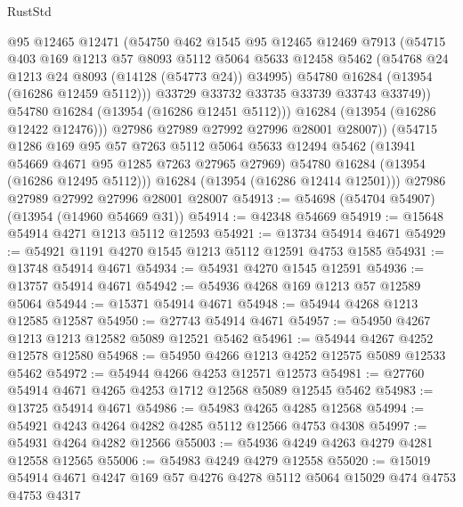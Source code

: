 \begin{lexlean}{RustStd}
\begin{coremodule}
                @95
                @12465
                @12471
                (@54750
                  @462
                  @1545
                  @95
                  @12465
                  @12469
                  @7913
                  (@54715
                    @403
                    @169
                    @1213
                    @57
                    @8093
                    @5112
                    @5064
                    @5633
                    @12458
                    @5462
                    (@54768 @24 @1213 @24 @8093 (@14128 (@54773 @24)) @34995)
                    @54780
                    @16284
                    (@13954 (@16286 @12459 @5112)))
                  @33729
                  @33732
                  @33735
                  @33739
                  @33743
                  @33749))
              @54780
              @16284
              (@13954 (@16286 @12451 @5112)))
            @16284
            (@13954 (@16286 @12422 @12476)))
          @27986
          @27989
          @27992
          @27996
          @28001
          @28007))
      (@54715
        @1286
        @169
        @95
        @57
        @7263
        @5112
        @5064
        @5633
        @12494
        @5462
        (@13941 @54669 @4671 @95 @1285 @7263 @27965 @27969)
        @54780
        @16284
        (@13954 (@16286 @12495 @5112)))
      @16284
      (@13954 (@16286 @12414 @12501)))
    @27986
    @27989
    @27992
    @27996
    @28001
    @28007
@54913 := @54698 (@54704 @54907) (@13954 (@14960 @54669 @31))
@54914 := @42348 @54669
@54919 := @15648 @54914 @4271 @1213 @5112 @12593
@54921 := @13734 @54914 @4671
@54929 := @54921 @1191 @4270 @1545 @1213 @5112 @12591 @4753 @1585
@54931 := @13748 @54914 @4671
@54934 := @54931 @4270 @1545 @12591
@54936 := @13757 @54914 @4671
@54942 := @54936 @4268 @169 @1213 @57 @12589 @5064
@54944 := @15371 @54914 @4671
@54948 := @54944 @4268 @1213 @12585 @12587
@54950 := @27743 @54914 @4671
@54957 := @54950 @4267 @1213 @1213 @12582 @5089 @12521 @5462
@54961 := @54944 @4267 @4252 @12578 @12580
@54968 := @54950 @4266 @1213 @4252 @12575 @5089 @12533 @5462
@54972 := @54944 @4266 @4253 @12571 @12573
@54981 := @27760 @54914 @4671 @4265 @4253 @1712 @12568 @5089 @12545 @5462
@54983 := @13725 @54914 @4671
@54986 := @54983 @4265 @4285 @12568
@54994 := @54921 @4243 @4264 @4282 @4285 @5112 @12566 @4753 @4308
@54997 := @54931 @4264 @4282 @12566
@55003 := @54936 @4249 @4263 @4279 @4281 @12558 @12565
@55006 := @54983 @4249 @4279 @12558
@55020 := @15019 @54914 @4671 @4247 @169 @57 @4276 @4278 @5112 @5064 @15029 @474 @4753 @4753 @4317

\end{coremodule}
\end{lexlean}
